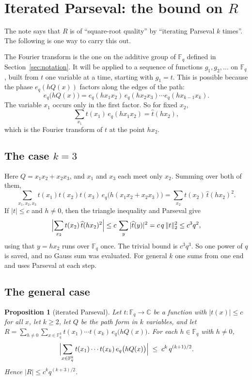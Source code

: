 \documentclass[11pt]{amsbook}
\theoremstyle{plain}
\newtheorem{proposition}[theorem]{Proposition}
\theoremstyle{definition}
\theoremstyle{remark}
\numberwithin{equation}{section}
\numberwithin{figure}{chapter}
\numberwithin{table}{chapter}
\renewcommand{\C}{\mathbb{C}}
\newcommand{\F}{\mathbb{F}}
\begin{document}
\section{Iterated Parseval: the bound on
  \texorpdfstring{$R$}{R}}
\label{sec:parseval}

The note says that $R$ is of ``square-root quality'' by ``iterating
Parseval $k$ times''. The following is one way to carry this out.

The Fourier transform is the one on the additive group of $\F_q$
defined in Section~\ref{sec:notation}. It will be applied to a
sequence of functions $g_1, g_2, \dots$ on $\F_q$, built from $t$
one variable at a time, starting with $g_1 = t$. This is possible
because the phase $e_q(hQ(x))$ factors along the edges of the path:
\[
  e_q\bigl(hQ(x)\bigr) = e_q(hx_1x_2)\,e_q(hx_2x_3)\cdots
  e_q(hx_{k-1}x_k).
\]
The variable $x_1$ occurs only in the first factor. So for fixed
$x_2$,
\[
  \sum_{x_1} t(x_1)\,e_q(hx_1x_2) = \widehat t(hx_2),
\]
which is the Fourier transform of $t$ at the point $hx_2$.

\subsection{The case $k = 3$}

Here $Q = x_1x_2 + x_2x_3$, and $x_1$ and $x_3$ each meet only
$x_2$. Summing over both of them,
\[
  \sum_{x_1,x_2,x_3} t(x_1)t(x_2)t(x_3)\,
  e_q\bigl(h(x_1x_2+x_2x_3)\bigr)
  = \sum_{x_2} t(x_2)\,\widehat t(hx_2)^2.
\]
If $|t| \le c$ and $h\ne0$, then the triangle inequality and
Parseval give
\[
  \Bigl|\sum_{x_2} t(x_2)\,\widehat t(hx_2)^2\Bigr|
  \le c\,\sum_{y}|\widehat t(y)|^2 = c\,q\,\|t\|_2^2 \le c^3 q^2,
\]
using that $y = hx_2$ runs over $\F_q$ once. The trivial bound is
$c^3q^3$. So one power of $q$ is saved, and no Gauss sum was
evaluated. For general $k$ one sums from one end and uses Parseval
at each step.

\subsection{The general case}

\begin{proposition}[iterated Parseval]\label{lem:parseval}
Let $t\colon\F_q\to\C$ be a function with $|t(x)| \le c$ for all
$x$, let $k\ge2$, let $Q$ be the path form in $k$ variables, and let
$R=\sum_{h\ne0}\sum_{x\in\F_q^k}t(x_1)\cdots t(x_k)\,
e_q\bigl(hQ(x)\bigr)$. For each $h \in\F_q$ with $h\ne 0$,
\[
  \Bigl|\sum_{x\in\F_q^k} t(x_1)\cdots t(x_k)\,
  e_q\bigl(hQ(x)\bigr)\Bigr| \;\le\; c^k\, q^{(k+1)/2}.
\]
Hence $|R| \le c^k q^{(k+3)/2}$.
\end{proposition}
\end{document}
